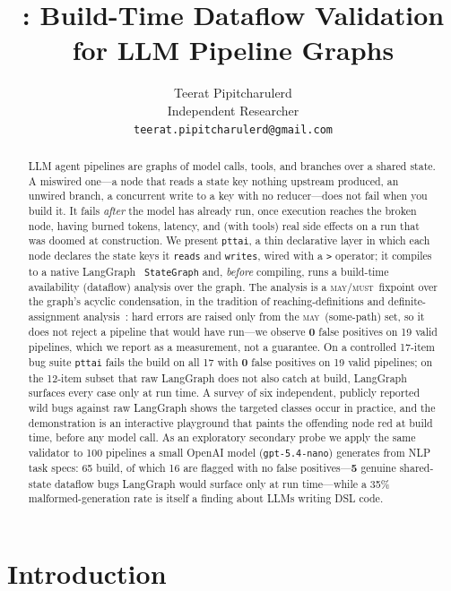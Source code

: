 \documentclass[11pt]{article}
\title{\code{pttai}: Build-Time Dataflow Validation for LLM Pipeline Graphs}
\author{
  Teerat Pipitcharulerd \\
  Independent Researcher \\
  \texttt{teerat.pipitcharulerd@gmail.com} \\
}
\newcommand{\may}{\textsc{may}}
\newcommand{\must}{\textsc{must}}
\newcommand{\code}[1]{\texttt{#1}}
\begin{document}
\maketitle

\begin{abstract}
LLM agent pipelines are graphs of model calls, tools, and branches over a shared
state. A miswired one---a node that reads a state key nothing upstream produced,
an unwired branch, a concurrent write to a key with no reducer---does not fail
when you build it. It fails \emph{after} the model has already run, once
execution reaches the broken node, having burned tokens, latency, and (with
tools) real side effects on a run that was doomed at construction. We present
\code{pttai}, a thin declarative layer in which each node declares the state keys
it \code{reads} and \code{writes}, wired with a \code{>} operator; it compiles to
a native LangGraph~\citep{langgraph} \code{StateGraph} and, \emph{before}
compiling, runs a build-time availability (dataflow) analysis over the graph. The
analysis is a \may/\must\ fixpoint over the graph's acyclic condensation, in the
tradition of reaching-definitions and definite-assignment
analysis~\citep{kildall,dragon,jls}: hard errors are raised only from the \may\
(some-path) set, so it does not reject a pipeline that would have run---we observe
\textbf{0} false positives on 19 valid pipelines, which we report as a
measurement, not a guarantee. On a controlled 17-item bug suite \code{pttai}
fails the build on all 17 with \textbf{0} false positives on 19 valid pipelines;
on the 12-item subset that raw LangGraph does not also catch at build, LangGraph
surfaces every case only at run time. A survey of six independent, publicly
reported wild bugs against raw LangGraph shows the targeted classes occur in
practice, and the demonstration is an interactive playground that paints the
offending node red at build time, before any model call. As an exploratory
secondary probe we apply the same validator to 100 pipelines a small OpenAI
model (\code{gpt-5.4-nano}) generates from NLP task specs: 65 build, of which 16
are flagged with no false positives---\textbf{5} genuine shared-state dataflow
bugs LangGraph would surface only at run time---while a 35\% malformed-generation
rate is itself a finding about LLMs writing DSL code.
\end{abstract}

\section{Introduction}
\end{document}
